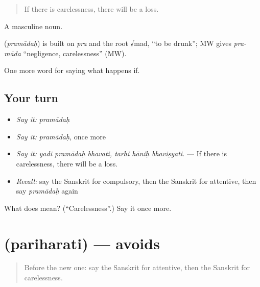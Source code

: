 \begin{quote}
If there is carelessness, there will be a loss.
\end{quote}

A masculine noun.

\begin{cousinweb}
\textbf{} (\emph{pramādaḥ}) is built on \emph{pra} and the root √mad, \textquotedblleft{}to be drunk\textquotedblright{}; MW gives \emph{pra-māda} \textquotedblleft{}negligence, carelessness\textquotedblright{} (MW).
\end{cousinweb}

\begin{grammarlens}[title={What you've built}]
One more word for saying what happens if.
\end{grammarlens}

\subsection*{Your turn}
\begin{itemize}
\raggedright
  \item \emph{Say it:} \emph{pramādaḥ}
  \item \emph{Say it:} \emph{pramādaḥ}, once more
  \item \emph{Say it:} \emph{yadi pramādaḥ bhavati, tarhi hāniḥ bhaviṣyati.} — If there is carelessness, there will be a loss.
  \item \emph{Recall:} say the Sanskrit for compulsory, then the Sanskrit for attentive, then say \emph{pramādaḥ} again
\end{itemize}

\begin{tcolorbox}[breakable,colback=teal!4,colframe=teal!35!black,title={Before you move on}]
What does  mean? (\textquotedblleft{}Carelessness\textquotedblright{}.) Say it once more.
\end{tcolorbox}
\section[\texorpdfstring{\sk{परिहरति} (pariharati)}{परिहरति (pariharati)}]{ (pariharati) — avoids}

\label{lesson:SA-C374-pariharati}



\begin{quote}
Before the new one: say the Sanskrit for attentive, then the Sanskrit for carelessness.
\end{quote}

